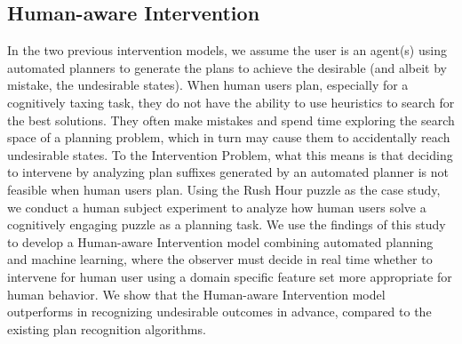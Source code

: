 \subsection{Human-aware Intervention}
In the two previous intervention models, we assume the user is an agent(s) using automated planners to generate the plans to achieve the desirable (and albeit by mistake, the undesirable states).
When human users plan, especially for a cognitively taxing task, they do not have the ability to use heuristics to search for the best solutions.
They often make mistakes and spend time exploring the search space of a planning problem, which in turn may cause them to accidentally reach undesirable states.
To the Intervention Problem, what this means is that deciding to intervene by analyzing plan suffixes generated by an automated planner is not feasible when human users plan.
Using the Rush Hour puzzle as the case study, we conduct a human subject experiment to analyze how human users solve a cognitively engaging puzzle as a planning task.
We use the findings of this study to develop a Human-aware Intervention model combining automated planning and machine learning, where the observer must decide in real time whether to intervene for human user using a domain specific feature set more appropriate for human behavior.
We show that the Human-aware Intervention model outperforms in recognizing undesirable outcomes in advance, compared to the existing plan recognition algorithms.


